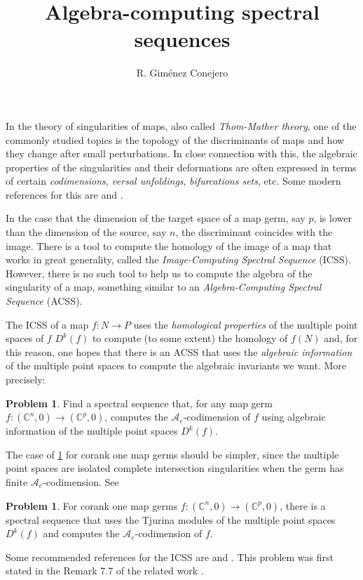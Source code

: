 \documentclass[a4paper,11pt]{amsart}
\theoremstyle{plain}
\theoremstyle{definition}
\newtheorem{problem}[theorem]{Problem}
\begin{document}
\author{R. Giménez Conejero}
\title{Algebra-computing spectral sequences}


\maketitle


In the theory of singularities of maps, also called \textsl{Thom-Mather theory}, one of the commonly studied topics is the topology of the discriminants of maps and how they change after small perturbations. In close connection with this, the algebraic properties of the singularities and their deformations are often expressed in terms of certain \textsl{codimensions}, \textsl{versal unfoldings}, \textsl{bifurcations sets}, etc. Some modern references for this are \cite{Mond2020} and \cite[Chapter 2]{HB3}.

In the case that the dimension of the target space of a map germ, say $p$, is lower than the dimension of the source, say $n$, the discriminant coincides with the image. There is a tool to compute the homology of the image of a map that works in great generality, called the \textit{Image-Computing Spectral Sequence} (ICSS). However, there is no such tool to help us to compute the algebra of the singularity of a map, something similar to an \textsl{Algebra-Computing Spectral Sequence} (ACSS).

The ICSS of a map $f:N\rightarrow P$ uses the \textsl{homological properties} of the multiple point spaces of $f$ $D^k(f)$ to compute (to some extent) the homology of $f(N)$ and, for this reason, one hopes that there is an ACSS that uses the \textsl{algebraic information} of the multiple point spaces to compute the algebraic invariants we want. More precisely:

\begin{problem}\label{prob:ACSS}
Find a spectral sequence that, for any map germ $f:(\mathbb{C}^n,0)\rightarrow(\mathbb{C}^p,0)$, computes the $\mathscr{A}_e$-codimension of $f$ using algebraic information of the multiple point spaces $D^k(f)$.
\end{problem}

The case of \cref{prob:ACSS} for corank one map germs should be simpler, since the multiple point spaces are isolated complete intersection singularities when the germ has finite $\mathscr{A}_e$-codimension. See \cite[Proposition 2.14]{Marar1989}

\begin{problem}
For corank one map germs $f:(\mathbb{C}^n,0)\rightarrow(\mathbb{C}^p,0)$, there is a spectral sequence that uses the Tjurina modules of the multiple point spaces $D^k(f)$ and computes the $\mathscr{A}_e$-codimension of $f$.
\end{problem}

Some recommended references for the ICSS are \cite{Goryunov1993,Houston2007,CisnerosMolina2022} and \cite[Chapter 2]{Robertothesis}. This problem was first stated in the Remark 7.7 of the related work \cite{GimenezConejero2022c}.



\end{document}
